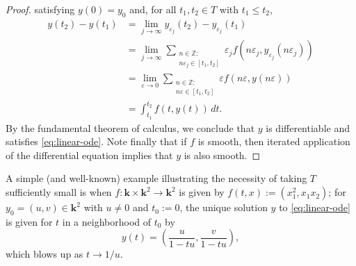 \documentclass[reqno]{amsart} 
\def\eps{\varepsilon}
\begin{document}
\begin{proof}
  satisfying $y(0) = y_0$ and, for all $t_1,t_2 \in T$ with $t_1 \leq t_2$,
  \begin{align*}
    y(t_2) - y(t_1)
    &=
  \lim_{j \rightarrow \infty}
      y_{\eps_j}(t_2) - y_{\eps_j}(t_1)
      \\
    &=
  \lim_{j \rightarrow \infty}
  \sum _{
    \substack{
      n \in \mathbb{Z} : \\
      n \eps_j \in [t_1,t_2]
    }
  }
    \eps_j f(n \eps_j, y_{\eps_j}(n \eps_j))
    \\
    &=
  \lim_{\eps \rightarrow 0}
  \sum _{
    \substack{
      n \in \mathbb{Z} : \\
      n \eps \in [t_1,t_2]
    }
  }
    \eps f(n \eps, y(n \eps))
    \\
    &=
  \int_{t_1}^{t_2} f(t,y(t)) \, d t.
  \end{align*}
  By the fundamental theorem of calculus, we
  conclude that $y$ is differentiable and satisfies \eqref{eq:linear-ode}.
 Note finally that if $f$ is smooth, then iterated application
  of the differential equation implies that $y$ is also smooth.
\end{proof}
\begin{example}
  A simple (and well-known) example
  illustrating the necessity of taking $T$ sufficiently small
  is when
  $f : \mathbf{k} \times \mathbf{k}^2 \rightarrow \mathbf{k}^2$
  is given by
  $f(t,x) := (x_1^2,x_1 x_2)$;
  for $y_0 = (u,v) \in \mathbf{k}^2$
  with $u \neq 0$
  and $t_0 := 0$,
  the unique solution $y$ to \eqref{eq:linear-ode}
  is given for $t$ in a neighborhood of $t_0$ by
  \begin{equation*}
    y(t)
    = (\frac{u}{1 - t u}, \frac{v}{1 - t u}),
  \end{equation*}
  which blows up as $t \rightarrow 1/u$.
\end{example}
\end{document}

